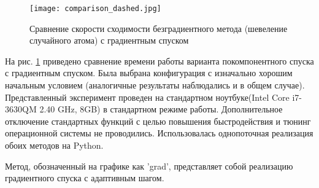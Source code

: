   \begin{figure}
  \begin{center}
  \texttt{[image: comparison\_dashed.jpg]}
  \end{center}
  \caption{Сравнение скорости сходимости безградиентного метода (шевеление случайного атома) с градиентным спуском}
   \label{Compare}
  \end{figure}

  На рис. \ref{Compare} приведено сравнение времени работы варианта покомпонентного спуска с градиентным спуском. Была выбрана конфигурация с изначально хорошим начальным условием (аналогичные результаты наблюдались и в общем случае). Представленный эксперимент проведен на стандартном ноутбуке(Intel Core i7-3630QM 2.40 GHz, 8GB) в стандартном режиме работы. Дополнительное отключение стандартных функций с целью повышения быстродействия и тюнинг операционной системы не проводились. Использовалась однопоточная реализация обоих методов на Python.

  Метод, обозначенный на графике как 'grad', представляет собой реализацию градиентного спуска с адаптивным шагом. 
  \iffalse
  При движении в направлении возрастания значения составляющей градиента мы уменьшаем величину шага, оставляя 0.8 от предыдущего значения. При уменьшении составляющей градиента -- возвращаемся к начальному значению.


  \begin{algorithm}
  \caption{Градиетный спуск}
  \SetKwFunction{FMain}{Вычисление шага}
  \SetKwProg{Fn}{Function}{:}{}
    \Fn{\FMain{}}{
    $ x^{k+1} = x^k - h * p^k;$ \tcp{$ p^k = \nabla f\left( x^k \right) $}   

    {\eIf{$ p^k \leq p^{k-1} $ \tcp{ Сравнение по каждой координате}}
    	{$ h = h - h * 0.2;$}
    	{$ h = startStep;$ \tcp{В эксперименте startStep = 0.015(const)}}
    }
  }
  \end{algorithm}

  \fi

